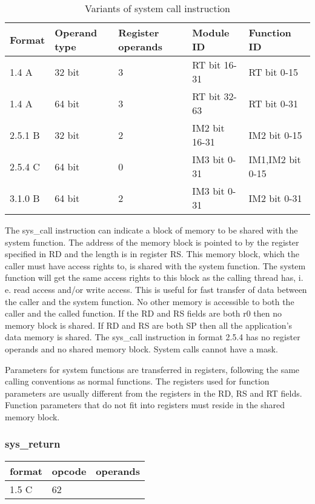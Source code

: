 \documentclass[forwardcom.tex]{subfiles}
\begin{document}
\begin{longtable}
{|p{20mm}|p{20mm}|p{20mm}|p{30mm}|p{30mm}|}
\caption{Variants of system call instruction}
\label{table:sysCallInstruction}
\endfirsthead
\endhead
\hline
Format & Operand type & Register operands & Module ID & Function ID \\
\hline
1.4 A & 32 bit & 3 & RT bit 16-31 & RT bit 0-15 \\
\hline
1.4 A & 64 bit & 3 & RT bit 32-63 & RT bit 0-31 \\
\hline
2.5.1 B & 32 bit & 2 & IM2 bit 16-31 & IM2 bit 0-15\\
\hline
2.5.4 C & 64 bit & 0  & IM3 bit 0-31 & IM1,IM2 bit 0-15 \\
\hline
3.1.0 B & 64 bit & 2  & IM3 bit 0-31 & IM2 bit 0-31 \\
\hline
\end{longtable}

The sys\_call instruction can indicate a block of memory to be shared with the system function. The address of the memory block is pointed to by the register specified in RD and the length is in register RS. This memory block, which the caller must have access rights to, is shared with the system function. The system function will get the same access rights to this block as the calling thread has, i. e. read access and/or write access. This is useful for fast transfer of data between the caller and the system function. No other memory is accessible to both the caller and the called function. If the RD and RS fields are both r0 then no memory block is shared. If RD and RS are both SP then all the application's data memory is shared. The sys\_call instruction in format 2.5.4 has no register operands and no shared memory block. System calls cannot have a mask.
\vspace{2mm}

Parameters for system functions are transferred in registers, following the same calling conventions as normal functions. The registers used for function parameters are usually different from the registers in the RD, RS and RT fields. Function parameters that do not fit into registers must reside in the shared memory block.


\subsubsection{sys\_return}
\label{table:sysCallInstruction}
\begin{tabular}{|p{12mm}|p{12mm}|p{110mm}|}
\hline
\bfseries format & \bfseries opcode & \bfseries operands \\ \hline
1.5 C & 62 & \\ \hline
\end{tabular}
\vspace{2mm}
\end{document}
